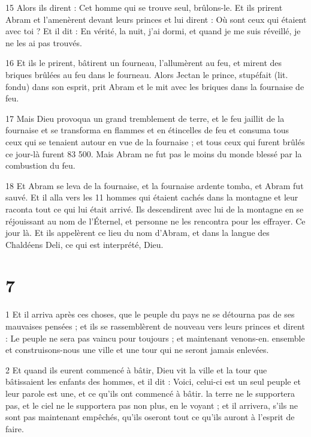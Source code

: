 \par 15 Alors ils dirent : Cet homme qui se trouve seul, brûlons-le. Et ils prirent Abram et l'amenèrent devant leurs princes et lui dirent : Où sont ceux qui étaient avec toi ? Et il dit : En vérité, la nuit, j'ai dormi, et quand je me suis réveillé, je ne les ai pas trouvés.

\par 16 Et ils le prirent, bâtirent un fourneau, l'allumèrent au feu, et mirent des briques brûlées au feu dans le fourneau. Alors Jectan le prince, stupéfait (lit. fondu) dans son esprit, prit Abram et le mit avec les briques dans la fournaise de feu.

\par 17 Mais Dieu provoqua un grand tremblement de terre, et le feu jaillit de la fournaise et se transforma en flammes et en étincelles de feu et consuma tous ceux qui se tenaient autour en vue de la fournaise ; et tous ceux qui furent brûlés ce jour-là furent 83 500. Mais Abram ne fut pas le moins du monde blessé par la combustion du feu.

\par 18 Et Abram se leva de la fournaise, et la fournaise ardente tomba, et Abram fut sauvé. Et il alla vers les 11 hommes qui étaient cachés dans la montagne et leur raconta tout ce qui lui était arrivé. Ils descendirent avec lui de la montagne en se réjouissant au nom de l'Éternel, et personne ne les rencontra pour les effrayer. Ce jour là. Et ils appelèrent ce lieu du nom d'Abram, et dans la langue des Chaldéens Deli, ce qui est interprété, Dieu.



\chapter{7}

\par 1 Et il arriva après ces choses, que le peuple du pays ne se détourna pas de ses mauvaises pensées ; et ils se rassemblèrent de nouveau vers leurs princes et dirent : Le peuple ne sera pas vaincu pour toujours ; et maintenant venons-en. ensemble et construisons-nous une ville et une tour qui ne seront jamais enlevées.

\par 2 Et quand ils eurent commencé à bâtir, Dieu vit la ville et la tour que bâtissaient les enfants des hommes, et il dit : Voici, celui-ci est un seul peuple et leur parole est une, et ce qu'ils ont commencé à bâtir. la terre ne le supportera pas, et le ciel ne le supportera pas non plus, en le voyant ; et il arrivera, s'ils ne sont pas maintenant empêchés, qu'ils oseront tout ce qu'ils auront à l'esprit de faire.

